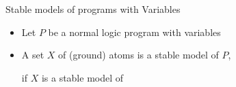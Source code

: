 \begin{frame}{Stable models of programs with Variables}
  \bigskip
  \begin{itemize}
  \item
    Let $P$ be a normal logic program with variables
    \medskip
  \item<2->
    A set $X$ of (\alert{ground}) atoms is a \alert{stable model} of $P$,
    \par\smallskip
    if $X$ is a stable model of \alert{}
  \end{itemize}
\end{frame}
%

